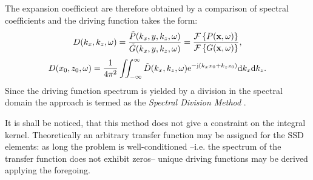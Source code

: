 The expansion coefficient are therefore obtained by a comparison of spectral coefficients and the driving function takes the form:
\begin{equation}
D(k_x,k_z,\omega) = \frac{\tilde{P}(k_x,y,k_z, \omega)}{ \tilde{G}(k_x,y,k_z, \omega)} = 
\frac{\mathcal{F}\left\{ P(\mathbf{x},\omega) \right\} }
{  \mathcal{F}\left\{ G(\mathbf{x},\omega) \right\} },
\end{equation}
\begin{equation}
D(x_0,z_0,\omega) = \frac{1}{4\pi^2} \iint_{-\infty}^{\infty} \tilde{D}(k_x,k_z, \omega) \mathrm{e}^{-\mathrm{j} (k_x x_0 + k_z z_0)} \mathrm{d} k_x \mathrm{d} k_z.
\label{Eq:Theory:Dkx_inverse_Fourier}
\end{equation}
Since the driving function spectrum is yielded by a division in the spectral domain the approach is termed as the \emph{Spectral Division Method} \cite{Ahrens2010a, Ahrens2012:Ambisonics_for_planar_linear, Ahrens2011:icassp, Ahrens2010:Ambisonics_w_planar_linear}.

It is shall be noticed, that this method does not give a constraint on the integral kernel. Theoretically an arbitrary transfer function may be assigned for the SSD elements: as long the problem is well-conditioned --i.e. the spectrum of the transfer function does not exhibit zeros-- unique driving functions may be derived applying the foregoing.

